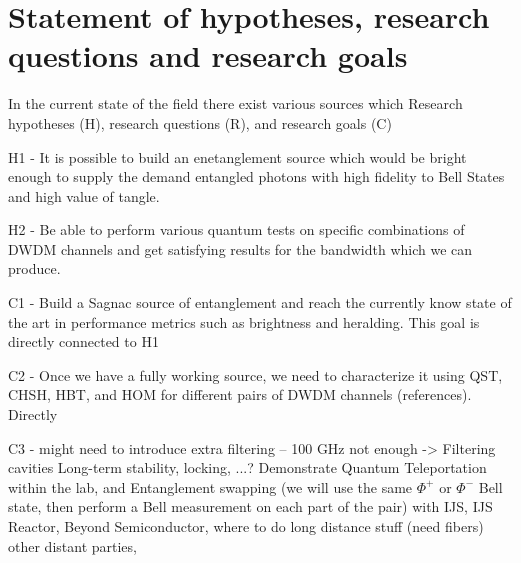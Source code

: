 \documentclass{article}
\theoremstyle{mytheoremstyle}
\theoremstyle{mytheoremstyle}
\theoremstyle{myproblemstyle}
\begin{document}
\section{Statement of hypotheses, research questions and research goals}


In the current state of the field there exist various sources which 
Research hypotheses (H), research questions (R), and research goals (C)

H1 - It is possible to build an enetanglement source which would be bright enough to supply the demand entangled photons with high fidelity to Bell States and
high value of tangle.

H2 - Be able to perform various quantum tests on specific combinations of DWDM channels and get satisfying results for the bandwidth which we can
produce.

C1 - Build a Sagnac source of entanglement and reach the currently know state of the art in performance metrics such as brightness and heralding. 
This goal is directly connected to H1 

C2 - Once we have a fully working source, we need to characterize it using QST, CHSH, HBT, and HOM for different pairs of DWDM channels (references). Directly 

C3 - might need to introduce extra filtering -- 100 GHz not enough -> Filtering cavities
Long-term stability, locking, ...? Demonstrate Quantum Teleportation within the lab, and Entanglement swapping (we will use the same $\Phi^+$ or $\Phi^-$ Bell state,
then perform a Bell measurement on each part of the pair) with IJS, IJS Reactor, Beyond Semiconductor, where to do
long distance stuff (need fibers) other distant parties,
\end{document}
